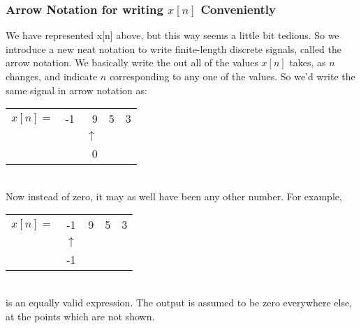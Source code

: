 \subsubsection{Arrow Notation for writing $x[n]$ Conveniently}
We have represented x[n] above, but this way seems a little bit tedious. So we introduce a new neat notation to write finite-length discrete signals, called the arrow notation. We basically write the out all of the values $x[n]$ takes, as $n$ changes, and indicate $n$ corresponding to any one of the values. So we'd write the same signal in arrow notation as:\\
\begin{tabular}{ l  c r r r }
  $x[n] =$ & -1 & 9 & 5 & 3 \\
   &  & $\uparrow$ &  & \\
   &  & 0 &  & \\
\end{tabular}\\
Now instead of zero, it may as well have been any other number. For example,\\
\begin{tabular}{ l  c r r r }
  $x[n] =$ & -1 & 9 & 5 & 3 \\
   &   $\uparrow$& &  & \\
   &   -1& &  & \\
\end{tabular}\\
is an equally valid expression. The output is assumed to be zero everywhere else, at the points which are not shown.

